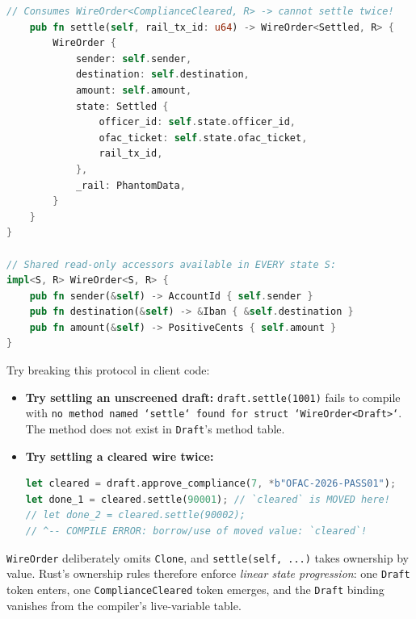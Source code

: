 \begin{lstlisting}[language=Rust]
    // Consumes WireOrder<ComplianceCleared, R> -> cannot settle twice!
    pub fn settle(self, rail_tx_id: u64) -> WireOrder<Settled, R> {
        WireOrder {
            sender: self.sender,
            destination: self.destination,
            amount: self.amount,
            state: Settled {
                officer_id: self.state.officer_id,
                ofac_ticket: self.state.ofac_ticket,
                rail_tx_id,
            },
            _rail: PhantomData,
        }
    }
}

// Shared read-only accessors available in EVERY state S:
impl<S, R> WireOrder<S, R> {
    pub fn sender(&self) -> AccountId { self.sender }
    pub fn destination(&self) -> &Iban { &self.destination }
    pub fn amount(&self) -> PositiveCents { self.amount }
}
\end{lstlisting}

Try breaking this protocol in client code:
\begin{itemize}
  \item \textbf{Try settling an unscreened draft:} \texttt{draft.settle(1001)} fails to compile with \texttt{no method named `settle` found for struct `WireOrder<Draft>`}. The method does not exist in \texttt{Draft}'s method table.
  \item \textbf{Try settling a cleared wire twice:}
\begin{lstlisting}[language=Rust]
let cleared = draft.approve_compliance(7, *b"OFAC-2026-PASS01");
let done_1 = cleared.settle(90001); // `cleared` is MOVED here!
// let done_2 = cleared.settle(90002);
// ^-- COMPILE ERROR: borrow/use of moved value: `cleared`!
\end{lstlisting}
\end{itemize}

\texttt{WireOrder} deliberately omits \texttt{Clone}, and \texttt{settle(self, ...)} takes ownership by value. Rust's ownership rules therefore enforce \emph{linear state progression}: one \texttt{Draft} token enters, one \texttt{Compliance\allowbreak{}Cleared} token emerges, and the \texttt{Draft} binding vanishes from the compiler's live-variable table.

